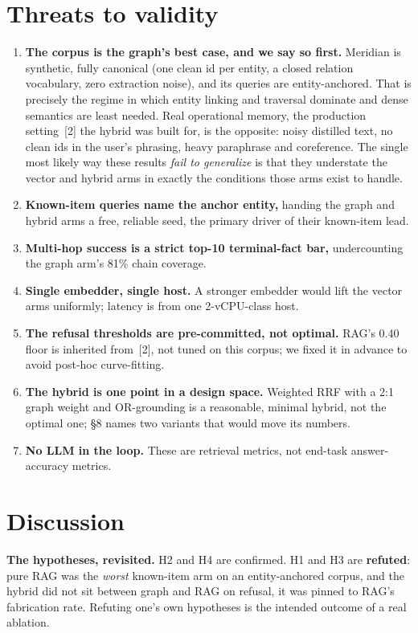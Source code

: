 \documentclass[11pt]{article}
\begin{document}
\section{Threats to validity}
\begin{enumerate}
  \item \textbf{The corpus is the graph's best case, and we say so first.} Meridian is
  synthetic, fully canonical (one clean id per entity, a closed relation vocabulary, zero
  extraction noise), and its queries are entity-anchored. That is precisely the regime in
  which entity linking and traversal dominate and dense semantics are least needed. Real
  operational memory, the production setting~[2] the hybrid was built for, is the opposite:
  noisy distilled text, no clean ids in the user's phrasing, heavy paraphrase and
  coreference. The single most likely way these results \emph{fail to generalize} is that
  they understate the vector and hybrid arms in exactly the conditions those arms exist to
  handle.
  \item \textbf{Known-item queries name the anchor entity,} handing the graph and hybrid arms
  a free, reliable seed, the primary driver of their known-item lead.
  \item \textbf{Multi-hop success is a strict top-10 terminal-fact bar,} undercounting the
  graph arm's 81\% chain coverage.
  \item \textbf{Single embedder, single host.} A stronger embedder would lift the vector arms
  uniformly; latency is from one 2-vCPU-class host.
  \item \textbf{The refusal thresholds are pre-committed, not optimal.} RAG's 0.40 floor is
  inherited from~[2], not tuned on this corpus; we fixed it in advance to avoid post-hoc
  curve-fitting.
  \item \textbf{The hybrid is one point in a design space.} Weighted RRF with a 2:1 graph
  weight and OR-grounding is a reasonable, minimal hybrid, not the optimal one; \S8 names two
  variants that would move its numbers.
  \item \textbf{No LLM in the loop.} These are retrieval metrics, not end-task answer-accuracy
  metrics.
\end{enumerate}

\section{Discussion}
\textbf{The hypotheses, revisited.} H2 and H4 are confirmed. H1 and H3 are \textbf{refuted}:
pure RAG was the \emph{worst} known-item arm on an entity-anchored corpus, and the hybrid did
not sit between graph and RAG on refusal, it was pinned to RAG's fabrication rate. Refuting
one's own hypotheses is the intended outcome of a real ablation.
\end{document}
